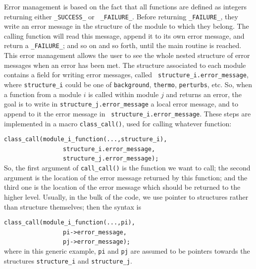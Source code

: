 \documentclass{article}
\begin{document}
Error management is based on the fact that all functions are defined
as integers returning either {\tt \_SUCCESS\_} or {\tt
  \_FAILURE\_}. Before returning {\tt \_FAILURE\_}, they write an
error message in the structure of the module to which they belong. The
calling function will read this message, append it to its own error
message, and return a {\tt \_FAILURE\_}; and so on and so forth, until
the main routine is reached. This error management allows the user to
see the whole nested structure of error messages when an error has
been met. The structure associated to each module contains a field
for writing error messages, called {\tt
  structure\_i.error\_message}, where {\tt structure\_i} could be one of {\tt background}, {\tt thermo}, {\tt perturbs}, etc. So, when a function from a module $i$
is called within module $j$ and returns an error, the goal is to write
in {\tt structure\_j.error\_message} a local error message, and to
append to it the error message in {\tt
  structure\_i.error\_message}. These steps are implemented in a macro
{\tt class\_call()}, used for calling whatever function:

\vspace{0.5cm}

\noindent
{\tt class\_call(module\_i\_function(...,structure\_i),}\\
\mbox{ }~~~~~~~~~~~~~~~~{\tt structure\_i.error\_message,} \\ 
\mbox{ }~~~~~~~~~~~~~~~~{\tt structure\_j.error\_message);}\\
    
\noindent
So, the first argument of {\tt call\_call()} is the function we want
to call; the second argument is the location of the error message
returned by this function; and the third one is the location of the
error message which should be returned to the higher level. 
Usually, in the bulk of the code, we use pointer to structures rather than structure themselves; then the syntax is

\vspace{0.5cm}

\noindent
{\tt class\_call(module\_i\_function(...,pi),}\\
\mbox{ }~~~~~~~~~~~~~~~~{\tt pi->error\_message,} \\ 
\mbox{ }~~~~~~~~~~~~~~~~{\tt pj->error\_message);}\\
    
\noindent
where in this generic example, {\tt pi} and {\tt pj} are assumed to be pointers towards the structures 
{\tt structure\_i} and {\tt structure\_j}.
\end{document}
